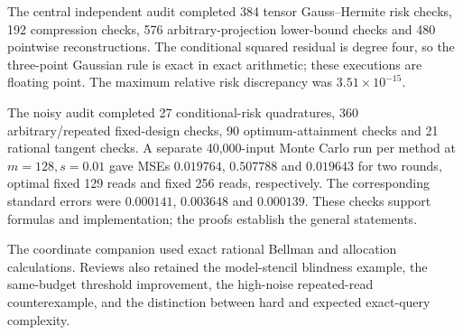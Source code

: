 \documentclass[11pt,a4paper]{article}
\begin{document}
The central independent audit completed 384 tensor Gauss--Hermite risk checks, 192 compression checks, 576 arbitrary-projection lower-bound checks and 480 pointwise reconstructions. The conditional squared residual is degree four, so the three-point Gaussian rule is exact in exact arithmetic; these executions are floating point. The maximum relative risk discrepancy was $3.51\times10^{-15}$.

The noisy audit completed 27 conditional-risk quadratures, 360 arbitrary/repeated fixed-design checks, 90 optimum-attainment checks and 21 rational tangent checks. A separate 40,000-input Monte Carlo run per method at $m=128,s=0.01$ gave MSEs $0.019764$, $0.507788$ and $0.019643$ for two rounds, optimal fixed 129 reads and fixed 256 reads, respectively. The corresponding standard errors were $0.000141$, $0.003648$ and $0.000139$. These checks support formulas and implementation; the proofs establish the general statements.

The coordinate companion used exact rational Bellman and allocation calculations. Reviews also retained the model-stencil blindness example, the same-budget threshold improvement, the high-noise repeated-read counterexample, and the distinction between hard and expected exact-query complexity.
\end{document}
